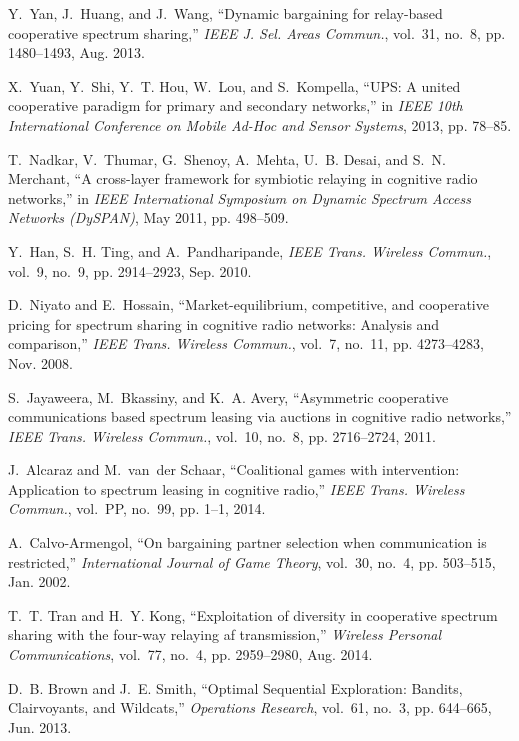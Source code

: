 \begin{thebibliography}{1}
Y.~Yan, J.~Huang, and J.~Wang, ``Dynamic bargaining for relay-based cooperative
  spectrum sharing,'' \emph{{IEEE} J. Sel. Areas Commun.}, vol.~31, no.~8, pp.
  1480--1493, Aug. 2013.

X.~Yuan, Y.~Shi, Y.~T. Hou, W.~Lou, and S.~Kompella, ``{UPS}: A united
  cooperative paradigm for primary and secondary networks,'' in \emph{{IEEE}
  10th International Conference on Mobile Ad-Hoc and Sensor Systems}, 2013, pp.
  78--85.

T.~Nadkar, V.~Thumar, G.~Shenoy, A.~Mehta, U.~B. Desai, and S.~N. Merchant, ``A
  cross-layer framework for symbiotic relaying in cognitive radio networks,''
  in \emph{{IEEE} International Symposium on Dynamic Spectrum Access Networks
  (DySPAN)}, May 2011, pp. 498--509.

Y.~Han, S.~H. Ting, and A.~Pandharipande, \emph{{IEEE} Trans. Wireless
  Commun.}, vol.~9, no.~9, pp. 2914--2923, Sep. 2010.


D.~Niyato and E.~Hossain, ``Market-equilibrium, competitive, and cooperative
  pricing for spectrum sharing in cognitive radio networks: Analysis and
  comparison,'' \emph{{IEEE} Trans. Wireless Commun.}, vol.~7, no.~11, pp.
  4273--4283, Nov. 2008.

S.~Jayaweera, M.~Bkassiny, and K.~A. Avery, ``Asymmetric cooperative
  communications based spectrum leasing via auctions in cognitive radio
  networks,'' \emph{{IEEE} Trans. Wireless Commun.}, vol.~10, no.~8, pp.
  2716--2724, 2011.

J.~Alcaraz and M.~van~der Schaar, ``Coalitional games with intervention:
  Application to spectrum leasing in cognitive radio,'' \emph{{IEEE} Trans.
  Wireless Commun.}, vol.~PP, no.~99, pp. 1--1, 2014.

A.~Calvo-Armengol, ``On bargaining partner selection when communication is
  restricted,'' \emph{International Journal of Game Theory}, vol.~30, no.~4,
  pp. 503--515, Jan. 2002.

T.~T. Tran and H.~Y. Kong, ``Exploitation of diversity in cooperative spectrum
  sharing with the four-way relaying af transmission,'' \emph{Wireless Personal
  Communications}, vol.~77, no.~4, pp. 2959--2980, Aug. 2014.

D.~B. Brown and J.~E. Smith, ``{Optimal Sequential Exploration: Bandits,
  Clairvoyants, and Wildcats},'' \emph{Operations Research}, vol.~61, no.~3,
  pp. 644--665, Jun. 2013.


\end{thebibliography}

